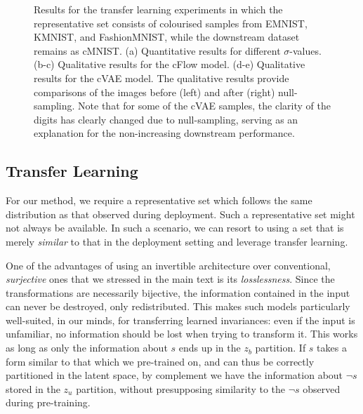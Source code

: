 \begin{figure}[htb]
{      \label{fig:cvae_tl_xd}
  }
  \caption{
    Results for the transfer learning experiments in which the representative set consists of
    colourised samples from EMNIST, KMNIST, and FashionMNIST, while the downstream dataset remains
    as cMNIST. 
    (a) Quantitative results for different $\sigma$-values. 
    (b-c) Qualitative results for the \ac{cFlow} model. 
    (d-e) Qualitative results for the \ac{cVAE} model. 
    The qualitative results provide comparisons of the images before (left) and after (right)
    null-sampling. 
    Note that for some of the \ac{cVAE} samples, the clarity of the digits has clearly changed due to
    null-sampling, serving as an explanation for the non-increasing downstream performance.
  }%
  \label{fig:cmnist-transfer-all}
  
\end{figure}

\subsection{Transfer Learning}\label{sec:transfer-learning}
%
\noindent For our method, we require a representative set which follows the same distribution as
that observed during deployment. 
%
Such a representative set might not always be available. 
%
In such a scenario, we can resort to using a set that is merely \emph{similar} to that in the
deployment setting and leverage transfer learning.

One of the advantages of using an invertible architecture over conventional, \emph{surjective} ones
that we stressed in the main text is its \emph{losslessness}. 
%
Since the transformations are necessarily bijective, the information contained in the input can
never be destroyed, only redistributed. 
%
This makes such models particularly well-suited, in our minds, for transferring
learned invariances: even if the input is unfamiliar, no information should be lost when trying to
transform it. 
%
This works as long as only the information about $s$ ends up in the $z_b$ partition.
%
If $s$ takes a form similar to that which we pre-trained on, and can thus be correctly partitioned
in the latent space, by complement we have the information about $\neg s$ stored in the $z_u$
partition, without presupposing similarity to the $\neg s$ observed during pre-training.
%
